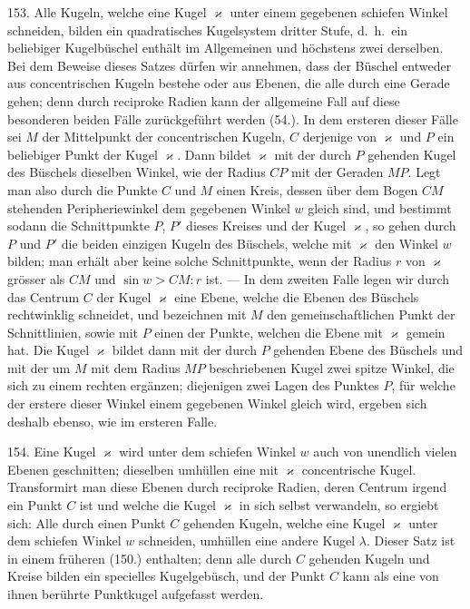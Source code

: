 \label{p17}


\hspace{\parindent}%
153. Alle Kugeln, welche eine Kugel $\varkappa$ unter einem
gegebenen schiefen Winkel schneiden, bilden ein {\glqq}quadratisches
Kugelsystem dritter Stufe{\grqq}, d.~h.\ ein beliebiger Kugelb\"uschel
enth\"alt im Allgemeinen und h\"ochstens zwei derselben.
Bei dem Beweise dieses Satzes d\"urfen wir annehmen,
dass der B\"uschel entweder aus concentrischen Kugeln bestehe
oder aus Ebenen, die alle durch eine Gerade gehen; denn
durch reciproke Radien kann der allgemeine Fall auf diese
besonderen beiden F\"alle zur\"uckgef\"uhrt werden (54.). In
dem ersteren dieser F\"alle sei $M$ der Mittelpunkt der concentrischen
Kugeln, $C$ derjenige von $\varkappa$ und $P$ ein beliebiger
Punkt der Kugel $\varkappa$. Dann bildet $\varkappa$ mit der durch $P$ gehenden
Kugel des B\"uschels dieselben Winkel, wie der Radius $CP$ mit
der Geraden $MP$. Legt man also durch die Punkte $C$ und
$M$ einen Kreis, dessen \"uber dem Bogen $CM$ stehenden Peripheriewinkel
dem gegebenen Winkel $w$ gleich sind, und bestimmt
sodann die Schnittpunkte $P$, $P'$ dieses Kreises und
der Kugel $\varkappa$, so gehen durch $P$ und $P'$ die beiden einzigen
Kugeln des B\"uschels, welche mit $\varkappa$ den Winkel $w$ bilden;
man erh\"alt aber keine solche Schnittpunkte, wenn der Radius $r$
von $\varkappa$ gr\"osser als $CM$ und $\sin w > CM : r$ ist. --- In dem
zweiten Falle legen wir durch das Centrum $C$ der Kugel $\varkappa$
eine Ebene, welche die Ebenen des B\"uschels rechtwinklig schneidet,
und bezeichnen mit $M$ den gemeinschaftlichen Punkt der
Schnittlinien, sowie mit $P$ einen der Punkte, welchen die
Ebene mit $\varkappa$ gemein hat. Die Kugel $\varkappa$ bildet dann mit der
durch $P$ gehenden Ebene des B\"uschels und mit der um $M$
mit dem Radius $MP$ beschriebenen Kugel zwei spitze Winkel,
die sich zu einem rechten erg\"anzen; diejenigen zwei
Lagen des Punktes $P$, f\"ur welche der erstere dieser Winkel
einem gegebenen Winkel gleich wird, ergeben sich deshalb
ebenso, wie im ersteren Falle.

154. Eine Kugel $\varkappa$ wird unter dem schiefen Winkel $w$
auch von unendlich vielen Ebenen geschnitten; dieselben umh\"ullen
eine mit $\varkappa$ concentrische Kugel. Transformirt man
diese Ebenen durch reciproke Radien, deren Centrum irgend
ein Punkt $C$ ist und welche die Kugel $\varkappa$ in sich selbst verwandeln,
so ergiebt sich: Alle durch einen Punkt $C$ gehenden
Kugeln, welche eine Kugel $\varkappa$ unter dem schiefen Winkel $w$
schneiden, umh\"ullen eine andere Kugel $\lambda$. Dieser Satz ist in
einem fr\"uheren (150.) enthalten; denn alle durch $C$ gehenden
Kugeln und Kreise bilden ein specielles Kugelgeb\"usch, und
der Punkt $C$ kann als eine von ihnen ber\"uhrte Punktkugel
aufgefasst werden.

